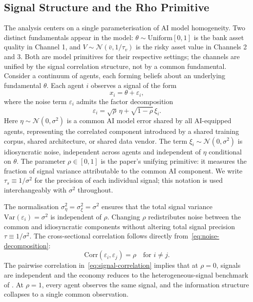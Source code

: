 \label{sec:model}
\subsection{Signal Structure and the Rho Primitive}
\label{sec:model-signal}

The analysis centers on a single parameterisation of AI model homogeneity. Two distinct fundamentals appear in the model: $\theta \sim \mathrm{Uniform}[0,1]$ is the bank asset quality in Channel 1, and $V \sim \mathcal{N}(\bar{v}, 1/\tau_v)$ is the risky asset value in Channels 2 and 3. Both are model primitives for their respective settings; the channels are unified by the signal correlation structure, not by a common fundamental. Consider a continuum of agents, each forming beliefs about an underlying fundamental $\theta$. Each agent $i$ observes a signal of the form
\begin{equation}\label{eq:signal-structure}
  x_i = \theta + \varepsilon_i,
\end{equation}
where the noise term $\varepsilon_i$ admits the factor decomposition
\begin{equation}\label{eq:noise-decomposition}
  \varepsilon_i = \sqrt{\rho}\,\eta + \sqrt{1-\rho}\,\xi_i.
\end{equation}
Here $\eta \sim \mathcal{N}(0,\sigma^2)$ is a common AI model error shared by all AI-equipped agents, representing the correlated component introduced by a shared training corpus, shared architecture, or shared data vendor. The term $\xi_i \sim \mathcal{N}(0,\sigma^2)$ is idiosyncratic noise, independent across agents and independent of $\eta$ conditional on $\theta$. The parameter $\rho \in [0,1]$ is the paper's unifying primitive: it measures the fraction of signal variance attributable to the common AI component. We write $\tau_s \equiv 1/\sigma^2$ for the precision of each individual signal; this notation is used interchangeably with $\sigma^2$ throughout.

The normalisation $\sigma_\eta^2 = \sigma_\xi^2 = \sigma^2$ ensures that the total signal variance $\mathrm{Var}(\varepsilon_i) = \sigma^2$ is independent of $\rho$. Changing $\rho$ redistributes noise between the common and idiosyncratic components without altering total signal precision $\tau \equiv 1/\sigma^2$. The cross-sectional correlation follows directly from~\eqref{eq:noise-decomposition}:
\begin{equation}\label{eq:signal-correlation}
  \mathrm{Corr}(\varepsilon_i, \varepsilon_j) = \rho \quad \text{for } i \neq j.
\end{equation}
The pairwise correlation in~\eqref{eq:signal-correlation} implies that at $\rho = 0$, signals are independent and the economy reduces to the heterogeneous-signal benchmark of \citet{morris1998}. At $\rho = 1$, every agent observes the same signal, and the information structure collapses to a single common observation.

